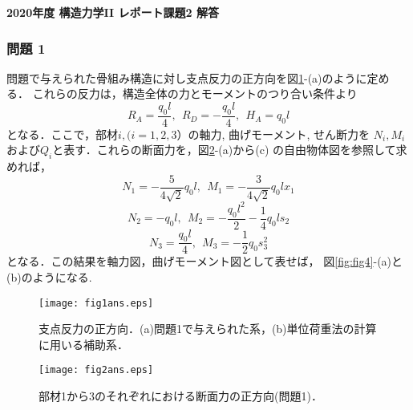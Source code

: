 \documentclass[10pt,a4j]{jarticle}
\newlength{\minitwocolumn}
\begin{document}
\newcommand{\fat}[1]{\mbox{\boldmath $#1$}}
\newcommand{\D}{\partial}
\newcommand{\w}{\omega}
\newcommand{\ga}{\alpha}
\newcommand{\gb}{\beta}
\newcommand{\gx}{\xi}
\newcommand{\gz}{\zeta}
\newcommand{\vhat}[1]{\hat{\fat{#1}}}
\newcommand{\spc}{\vspace{0.7\baselineskip}}
\newcommand{\halfspc}{\vspace{0.3\baselineskip}}

\pagestyle{empty}
\newcommand{\twofig}[2]
 {
   \begin{figure}[h]
     \begin{minipage}[t]{\minitwocolumn}
         \begin{center}   #1
         \end{center}
     \end{minipage}
         \hspace{\columnsep}
     \begin{minipage}[t]{\minitwocolumn}
         \begin{center} #2
         \end{center}
     \end{minipage}
   \end{figure}
 }
\begin{center}
	{\Large \bf 2020年度 構造力学II レポート課題2 解答} \\
\end{center}
\subsubsection*{問題 1}
	問題で与えられた骨組み構造に対し支点反力の正方向を図\ref{fig:fig1}-(a)のように定める．
	これらの反力は，構造全体の力とモーメントのつり合い条件より
	\[
		R_A=\frac{q_0l}{4}, \ \ R_D=-\frac{q_0l}{4}, \ \ H_A=q_0l
	\]
	となる．ここで，部材$i, (i=1,2,3）$の軸力, 曲げモーメント, せん断力を
	$N_i, M_i$および$Q_i$と表す．これらの断面力を，図\ref{fig:fig2}-(a)から(c)
	の自由物体図を参照して求めれば，
	\[
		N_1=-\frac{5}{4\sqrt{2}}q_0l, \ \ 
		M_1=-\frac{3}{4\sqrt{2}}q_0lx_1
	\]
	\[
		N_2=-q_0l, \ \ 
		M_2=-\frac{q_0l^2}{2}-\frac{1}{4}q_0ls_2
	\]
	\[
		N_3=\frac{q_0l}{4}, \ \ 
		M_3=-\frac{1}{2}q_0s_3^2
	\]
	となる．この結果を軸力図，曲げモーメント図として表せば，
	図\ref{fig:fig4}-(a)と(b)のようになる.
\begin{figure}[h]
	\begin{center}
	\texttt{[image: fig1ans.eps]} 
	\end{center}
	\caption{支点反力の正方向．(a)問題1で与えられた系，(b)単位荷重法の計算に用いる補助系．} 
	\label{fig:fig1}
\end{figure}
\begin{figure}[h]
	\begin{center}
	\texttt{[image: fig2ans.eps]} 
	\end{center}
	\caption{部材1から3のそれぞれにおける断面力の正方向(問題1)．}
	\label{fig:fig2}
\end{figure}
\end{document}
